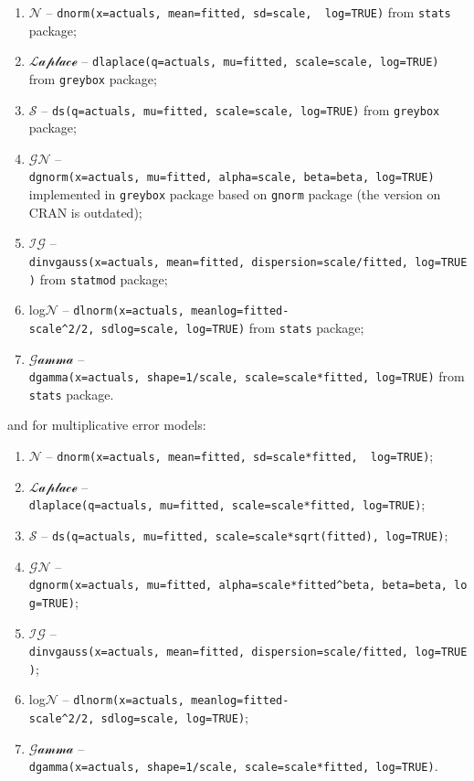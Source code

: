 \documentclass[
]{book}
\providecommand{\tightlist}{%
  \setlength{\itemsep}{0pt}\setlength{\parskip}{0pt}}
\theoremstyle{definition}
\theoremstyle{definition}
\theoremstyle{definition}
\theoremstyle{definition}
\theoremstyle{remark}
\begin{document}
\begin{enumerate}
\def\labelenumi{\arabic{enumi}.}
\tightlist
\item
  \(\mathcal{N}\) -- \texttt{dnorm(x=actuals,\ mean=fitted,\ sd=scale,\ \ log=TRUE)} from \texttt{stats} package;
\item
  \(\mathcal{Laplace}\) -- \texttt{dlaplace(q=actuals,\ mu=fitted,\ scale=scale,\ log=TRUE)} from \texttt{greybox} package;
\item
  \(\mathcal{S}\) -- \texttt{ds(q=actuals,\ mu=fitted,\ scale=scale,\ log=TRUE)} from \texttt{greybox} package;
\item
  \(\mathcal{GN}\) -- \texttt{dgnorm(x=actuals,\ mu=fitted,\ alpha=scale,\ beta=beta,\ log=TRUE)} implemented in \texttt{greybox} package based on \texttt{gnorm} package (the version on CRAN is outdated);
\item
  \(\mathcal{IG}\) -- \texttt{dinvgauss(x=actuals,\ mean=fitted,\ dispersion=scale/fitted,\ log=TRUE)} from \texttt{statmod} package;
\item
  log\(\mathcal{N}\) -- \texttt{dlnorm(x=actuals,\ meanlog=fitted-scale\^{}2/2,\ sdlog=scale,\ log=TRUE)} from \texttt{stats} package;
\item
  \(\mathcal{Gamma}\) -- \texttt{dgamma(x=actuals,\ shape=1/scale,\ scale=scale*fitted,\ log=TRUE)} from \texttt{stats} package.
\end{enumerate}

and for multiplicative error models:

\begin{enumerate}
\def\labelenumi{\arabic{enumi}.}
\tightlist
\item
  \(\mathcal{N}\) -- \texttt{dnorm(x=actuals,\ mean=fitted,\ sd=scale*fitted,\ \ log=TRUE)};
\item
  \(\mathcal{Laplace}\) -- \texttt{dlaplace(q=actuals,\ mu=fitted,\ scale=scale*fitted,\ log=TRUE)};
\item
  \(\mathcal{S}\) -- \texttt{ds(q=actuals,\ mu=fitted,\ scale=scale*sqrt(fitted),\ log=TRUE)};
\item
  \(\mathcal{GN}\) -- \texttt{dgnorm(x=actuals,\ mu=fitted,\ alpha=scale*fitted\^{}beta,\ beta=beta,\ log=TRUE)};
\item
  \(\mathcal{IG}\) -- \texttt{dinvgauss(x=actuals,\ mean=fitted,\ dispersion=scale/fitted,\ log=TRUE)};
\item
  log\(\mathcal{N}\) -- \texttt{dlnorm(x=actuals,\ meanlog=fitted-scale\^{}2/2,\ sdlog=scale,\ log=TRUE)};
\item
  \(\mathcal{Gamma}\) -- \texttt{dgamma(x=actuals,\ shape=1/scale,\ scale=scale*fitted,\ log=TRUE)}.
\end{enumerate}
\end{document}

